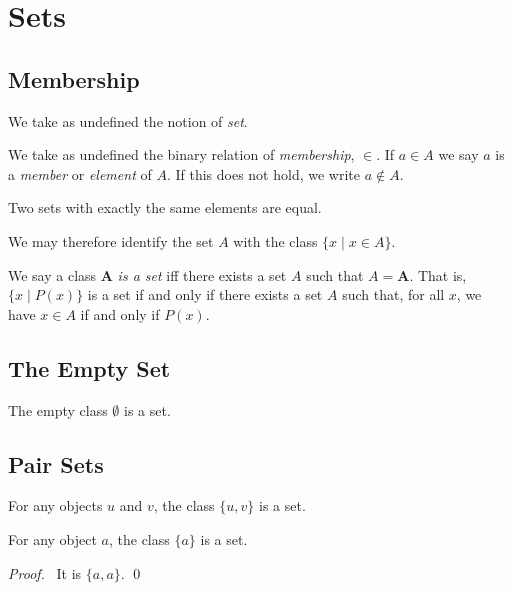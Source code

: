 \chapter{Sets}

\section{Membership}

We take as undefined the notion of \emph{set}.

We take as undefined the binary relation of \emph{membership}, $\in$. If $a \in A$ we say $a$ is a \emph{member} or \emph{element} of $A$.
If this does not hold, we write $a \notin A$.

\begin{axiom}
    Two sets with exactly the same elements are equal.
\end{axiom}

We may therefore identify the set $A$ with the class $\{x \mid x \in A \}$.

We say a class $\mathbf{A}$ \emph{is a set} iff there exists a set $A$
such that $A = \mathbf{A}$. That is, $\{ x \mid P(x) \}$ is a set if and only
if there exists a set $A$ such that, for all $x$, we have $x \in A$ if and
only if $P(x)$.

\section{The Empty Set}

\begin{axiom}
    The empty class $\emptyset$ is a set.
\end{axiom}

\section{Pair Sets}

\begin{axiom}
    For any objects $u$ and $v$, the class $\{ u, v \}$ is a set.
\end{axiom}

\begin{theorem}[Pairing]
    For any object $a$, the class $\{ a \}$ is a set.
\end{theorem}

\begin{proof}
    \pf\ It is $\{ a, a \}$. \qed
\end{proof}


